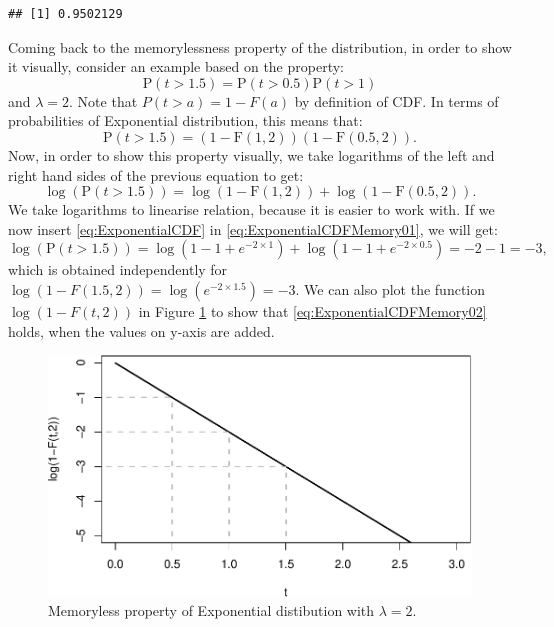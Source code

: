 \documentclass[
]{book}
\theoremstyle{definition}
\theoremstyle{definition}
\theoremstyle{definition}
\theoremstyle{definition}
\theoremstyle{remark}
\begin{document}
\begin{verbatim}
## [1] 0.9502129
\end{verbatim}

Coming back to the memorylessness property of the distribution, in order to show it visually, consider an example based on the property:
\begin{equation*}
    \mathrm{P}(t > 1.5) = \mathrm{P}(t > 0.5) \mathrm{P}(t > 1)
\end{equation*}
and \(\lambda=2\). Note that \(P(t>a)=1-F(a)\) by definition of CDF. In terms of probabilities of Exponential distribution, this means that:
\begin{equation*}
    \mathrm{P}(t > 1.5) = (1-\mathrm{F}(1, 2)) (1-\mathrm{F}(0.5, 2)) .
\end{equation*}
Now, in order to show this property visually, we take logarithms of the left and right hand sides of the previous equation to get:
\begin{equation}
    \log \left( \mathrm{P}(t > 1.5) \right) = \log \left(1-\mathrm{F}(1, 2) \right) + \log \left( 1-\mathrm{F}(0.5, 2)  \right) .
    \label{eq:ExponentialCDFMemory01}
\end{equation}
We take logarithms to linearise relation, because it is easier to work with. If we now insert \eqref{eq:ExponentialCDF} in \eqref{eq:ExponentialCDFMemory01}, we will get:
\begin{equation}
    \log \left( \mathrm{P}(t > 1.5) \right) = \log \left(1- 1 + e^{- 2 \times 1} \right) + \log \left(1- 1 + e^{- 2 \times 0.5} \right) = -2 - 1 = -3 ,
    \label{eq:ExponentialCDFMemory02}
\end{equation}
which is obtained independently for \(\log(1-F(1.5, 2))=\log(e^{-2 \times 1.5})=-3\). We can also plot the function \(\log(1-F(t, 2))\) in Figure \ref{fig:pexpPlotMemory} to show that \eqref{eq:ExponentialCDFMemory02} holds, when the values on y-axis are added.

\begin{figure}
\centering
\includegraphics{Svetunkov---Statistics-for-Business-Analytics_files/figure-latex/pexpPlotMemory-1.pdf}
\caption{\label{fig:pexpPlotMemory}Memoryless property of Exponential distibution with \(\lambda=2\).}
\end{figure}
\end{document}

